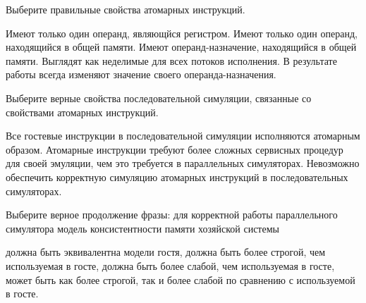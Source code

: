 \begin{questions}
\question[3] Выберите правильные свойства атомарных инструкций.
\begin{choices}
    \choice Имеют только один операнд, являющйся регистром.
    \choice Имеют только один операнд, находящийся в общей памяти.
    \correctchoice Имеют операнд-назначение, находящийся в общей памяти.
    \correctchoice Выглядят как неделимые для всех потоков исполнения.
    \choice В результате работы всегда изменяют значение своего операнда-назначения.
\end{choices}

\question[3] Выберите верные свойства последовательной симуляции, связанные со свойствами атомарных инструкций.
\begin{choices}
    \correctchoice Все гостевые инструкции в последовательной симуляции исполняются атомарным образом.
    \choice Атомарные инструкции требуют более сложных сервисных процедур для своей эмуляции, чем это требуется в параллельных симуляторах.
    \choice Невозможно обеспечить корректную симуляцию атомарных инструкций в последовательных симуляторах.
\end{choices}

\question[3] Выберите верное продолжение фразы: для корректной работы параллельного симулятора модель консистентности памяти хозяйской системы 
\begin{choices}
    \choice должна быть эквивалентна модели гостя,
    \correctchoice должна быть более строгой, чем используемая в госте,
    \choice должна быть более слабой, чем используемая в госте,
    \choice может быть как более строгой, так и более слабой по сравнению с используемой в госте.
\end{choices}





\end{questions}

